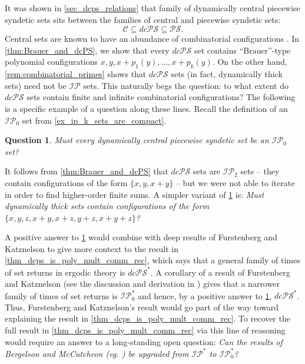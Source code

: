 \documentclass[letter,11pt]{article}
\theoremstyle{plain}
\newtheorem{question}[theorem]{Question}
\theoremstyle{definition}
\theoremstyle{plain}
\theoremstyle{plain}
\numberwithin{equation}{section}
\newcommand{\PS}{\mathcal{PS}}
\newcommand{\dcPS}{dc\mathcal{PS}}
\newcommand{\central}{\mathcal{C}}
\newcommand{\IP}{\mathcal{IP}}
\begin{document}
It was shown in \cref{sec_dcps_relations} that family of dynamically central piecewise syndetic sets sits between the families of central and piecewise syndetic sets:
\[\central \subseteq \dcPS \subseteq \PS.\]
Central sets are known to have an abundance of combinatorial configurations \cite[Ch. 14]{hindman_strauss_book_2012}. In \cref{thm:Brauer_and_dcPS}, we show that every $\dcPS$ set contains ``Brauer''-type polynomial configurations $x, y, x + p_1(y), \ldots, x + p_k(y)$. On the other hand, \cref{rem:combinatorial_primes} shows that $\dcPS$ sets (in fact, dynamically thick sets) need not be $\IP$ sets. This naturally begs the question: to what extent do $\dcPS$ sets contain finite and infinite combinatorial configurations?  The following is a specific example of a question along these lines.  Recall the definition of an $\IP_0$ set from \cref{ex_ip_k_sets_are_compact}.

\begin{question}
\label{ques:pointwise_recurrence_IP_0}
    Must every dynamically central piecewise syndetic set be an $\IP_0$ set?
\end{question}

It follows from \cref{thm:Brauer_and_dcPS} that $\dcPS$ sets are $\IP_2$ sets -- they contain configurations of the form $\{x, y, x+y\}$ -- but we were not able to iterate in order to find higher-order finite sums.  A simpler variant of \cref{ques:pointwise_recurrence_IP_0} is: \emph{Must dynamically thick sets contain configurations of the form $\{x,y,z, x+y,x+z,y+z, x+y+z\}$?}

A positive answer to \cref{ques:pointwise_recurrence_IP_0} would combine with deep results of Furstenberg and Katznelson to give more context to the result in \cref{thm_dcps_is_poly_mult_comm_rec}, which says that a general family of times of set returns in ergodic theory is $\dcPS^*$.
A corollary of a result of Furstenberg and Katznelson \cite[Thm. 10.3]{furstenberg_katznelson_1985} (see the discussion and derivation in \cite[Sec. 7.1]{bergelson_glasscock_2020}) gives that a narrower family of times of set returns is $\IP_0^*$ and hence, by a positive answer to \cref{ques:pointwise_recurrence_IP_0}, $\dcPS^*$. Thus, Furstenberg and Katznelson's result would go part of the way toward explaining the result in \cref{thm_dcps_is_poly_mult_comm_rec}.  To recover the full result in \cref{thm_dcps_is_poly_mult_comm_rec} via this line of reasoning would require an answer to a long-standing open question: \emph{Can the results of Bergelson and McCutcheon (eg. \cite[Thm. 7.12]{Bergelson-McCutcheon-IPpolynomialSzemeredi}) be upgraded from $\IP^*$ to $\IP_0^*$?}\\
\end{document}
